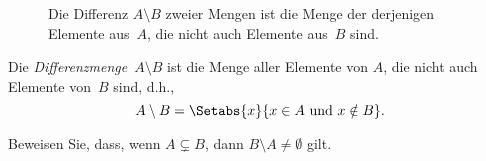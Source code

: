 \documentclass[../../../include/open-logic-section]{subfiles}
\begin{document}
\begin{figure}
  \caption{Die Differenz $A \setminus B$ zweier Mengen ist die Menge der
    derjenigen Elemente aus~$A$, die nicht auch Elemente aus~$B$ sind.}
\end{figure}

\begin{defn}[Differenz]
Die \emph{Differenzmenge}~$A \setminus B$ ist die Menge aller Elemente von
$A$, die nicht auch Elemente von~$B$ sind, d.h.,
\[
A\setminus B = \Setabs{x}{x\in A \text{ und } x \notin B}.
\]
\end{defn}

\begin{prob}
	Beweisen Sie, dass, wenn $A \subsetneq B$, dann $B \setminus A \neq \emptyset$ gilt.
\end{prob}
\end{document}
